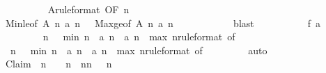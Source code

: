 \begin{isabellebody}
\ \ \ \ \ \ \ \ \isamarkupfalse%
\ A{\isacharbrackleft}rule{\isacharunderscore}format{\isacharcomma}\ OF\ {\isacharbackquoteopen}n\ {\isasymge}\ {}{\isacharbackquoteclose}{\isacharbrackright}\ \isanewline
\ \ \ \ \ \ \ \ \isamarkupfalse%
\ Min{\isacharunderscore}le{\isacharbrackleft}of\ {\isachardoublequoteopen}{\isacharquery}A\ n{\isachardoublequoteclose}\ {\isachardoublequoteopen}a\ {\isacharparenleft}n\ {\isacharminus}\ {}{\isacharparenright}{\isachardoublequoteclose}{\isacharbrackright}\ Max{\isacharunderscore}ge{\isacharbrackleft}of\ {\isachardoublequoteopen}{\isacharquery}A\ n{\isachardoublequoteclose}\ {\isachardoublequoteopen}a\ {\isacharparenleft}n\ {\isacharminus}\ {}{\isacharparenright}{\isachardoublequoteclose}{\isacharbrackright}\isanewline
\ \ \ \ \ \ \ \ \isamarkupfalse%
\ blast{\isacharplus}\isanewline
\ \ \ \ \isamarkupfalse%
\isanewline
\isanewline
\ \ \ \ \isamarkupfalse%
\ {\isachardoublequoteopen}{\isacharquery}f\ a\ {\isasymle}\ {\isacharquery}{\isasymDelta}\ {}{}{}{}{\isachardoublequoteclose}\isanewline
\ \ \ \ \ \ \isamarkupfalse%
\ {\isacharbackquoteopen}{\isasymforall}\ n\ {\isasymge}\ {}{\isachardot}\ {\isacharquery}min\ n\ {\isasymle}\ a\ n\ {\isasymand}\ a\ n\ {\isasymle}\ {\isacharquery}max\ n{\isacharbackquoteclose}{\isacharbrackleft}rule{\isacharunderscore}format{\isacharcomma}\ of\ {}{}{}{}{\isacharbrackright}\isanewline
\ \ \ \ \ \ \isamarkupfalse%
\ {\isacharbackquoteopen}{\isasymforall}\ n\ {\isasymge}\ {}{\isachardot}\ {\isacharquery}min\ n\ {\isasymle}\ a\ {\isacharparenleft}n{\isacharminus}{}{\isacharparenright}\ {\isasymand}\ a\ {\isacharparenleft}n{\isacharminus}{}{\isacharparenright}\ {\isasymle}\ {\isacharquery}max\ n{\isacharbackquoteclose}{\isacharbrackleft}rule{\isacharunderscore}format{\isacharcomma}\ of\ {}{}{}{}{\isacharbrackright}\isanewline
\ \ \ \ \ \ \isamarkupfalse%
\ auto\isanewline
\isanewline
\ \ \ \ \isamarkupfalse%
\ Claim{}{\isacharcolon}\ {\isachardoublequoteopen}{\isasymforall}\ n\ {\isachargreater}\ {}{\isachardot}\ {\isacharquery}{\isasymDelta}\ n\ {\isasymle}\ {\isacharparenleft}n{\isacharminus}{}{\isacharparenright}{\isacharslash}n\ {\isacharasterisk}\ {\isacharquery}{\isasymDelta}\ {\isacharparenleft}n{\isacharminus}{}{\isacharparenright}{\isachardoublequoteclose}\isanewline

\end{isabellebody}
